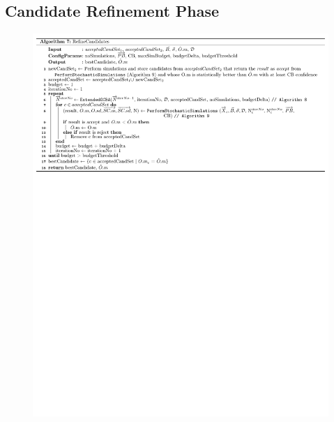 \documentclass[a4paper, 12pt]{article} %
\begin{document}
\subsection{Candidate Refinement Phase}
\label{ssec:refineCand}

\begin{figure}
	\begin{minipage}{\textwidth}
		\begin{center}
		\includegraphics[width=.7\textwidth]{pseudoCode/Algo7.pdf}
	\end{center}
	\end{minipage}
	\vspace{1em} %
	

\end{figure}
\end{document}
